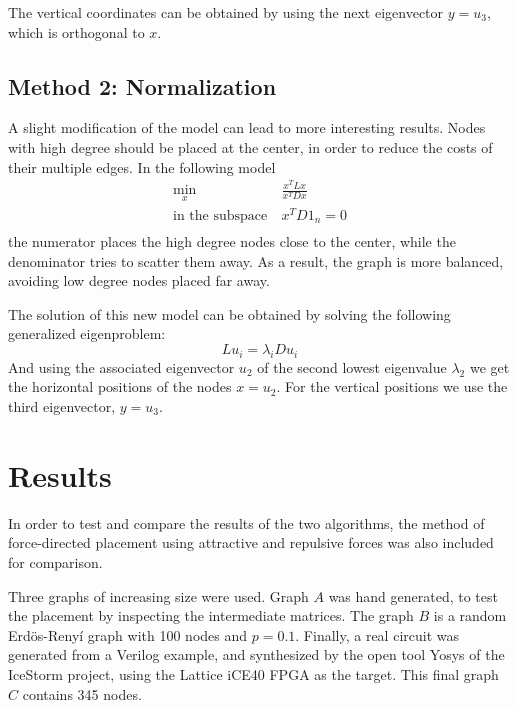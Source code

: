 \documentclass[a4paper,twocolumn]{article}
\begin{document}
The vertical coordinates can be obtained by using the next eigenvector $y = 
u_3$, which is orthogonal to $x$.

\subsection{Method 2: Normalization}

A slight modification of the model can lead to more interesting results. Nodes 
with high degree should be placed at the center, in order to reduce the costs of 
their multiple edges. In the following model
%
\begin{equation}
\begin{split}
\min_x \  & \frac{x^T L x}{x^T D x} \\
\textrm{in the subspace} \ & x^T D 1_n = 0 \\
\end{split}
\end{equation}
%
the numerator places the high degree nodes close to the center, while the 
denominator tries to scatter them away. As a result, the graph is more balanced, 
avoiding low degree nodes placed far away.

The solution of this new model can be obtained by solving the following 
generalized eigenproblem:
%
\begin{equation}
L u_i = \lambda_i D u_i
\end{equation}
%
And using the associated eigenvector $u_2$ of the second lowest eigenvalue 
$\lambda_2$ we get the horizontal positions of the nodes $x = u_2$. For the 
vertical positions we use the third eigenvector, $y = u_3$.

\section{Results}

In order to test and compare the results of the two algorithms, the method of 
force-directed placement \cite{forces} using attractive and repulsive forces was 
also included for comparison.

Three graphs of increasing size were used. Graph $A$ was hand generated, to test 
the placement by inspecting the intermediate matrices. The graph $B$ is a random 
Erdös-Renyí graph with 100 nodes and $p=0.1$. Finally, a real circuit was 
generated from a Verilog example, and synthesized by the open tool Yosys 
\cite{wolf} of the IceStorm project, using the Lattice iCE40 FPGA as the target.  
This final graph $C$ contains 345 nodes.
\end{document}
